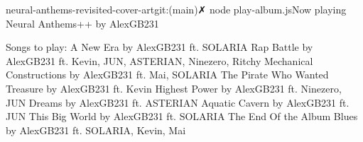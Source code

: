 \documentclass[preview]{standalone}
\begin{document}
\begin{center}
neural-anthems-revisited-cover-artgit:(main)✗ node play-album.jsNow playing Neural Anthems++ by AlexGB231

                        Songs to play:
                        A New Era by AlexGB231 ft. SOLARIA
                        Rap Battle by AlexGB231 ft. Kevin, JUN, ASTERIAN, Ninezero, Ritchy
                        Mechanical Constructions by AlexGB231 ft. Mai, SOLARIA
                        The Pirate Who Wanted Treasure by AlexGB231 ft. Kevin
                        Highest Power by AlexGB231 ft. Ninezero, JUN
                        Dreams by AlexGB231 ft. ASTERIAN
                        Aquatic Cavern by AlexGB231 ft. JUN
                        This Big World by AlexGB231 ft. SOLARIA
                        The End Of the Album Blues by AlexGB231 ft. SOLARIA, Kevin, Mai
\end{center}
\end{document}
